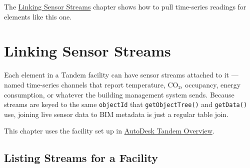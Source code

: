 \documentclass[
  11pt,
  letterpaper,
  DIV=11,
  numbers=noendperiod]{scrreprt}
\newenvironment{Shaded}{\begin{snugshade}}{\end{snugshade}}
\newcommand{\CommentTok}[1]{\textcolor[rgb]{0.37,0.37,0.37}{#1}}
\newcommand{\DecValTok}[1]{\textcolor[rgb]{0.68,0.00,0.00}{#1}}
\newcommand{\FunctionTok}[1]{\textcolor[rgb]{0.28,0.35,0.67}{#1}}
\newcommand{\NormalTok}[1]{\textcolor[rgb]{0.00,0.23,0.31}{#1}}
\newcommand{\OtherTok}[1]{\textcolor[rgb]{0.00,0.23,0.31}{#1}}
\newcommand{\SpecialCharTok}[1]{\textcolor[rgb]{0.37,0.37,0.37}{#1}}
\newcommand{\StringTok}[1]{\textcolor[rgb]{0.13,0.47,0.30}{#1}}
\begin{document}
\begin{Shaded}
\end{Shaded}

The \href{sensor-streams.qmd}{Linking Sensor Streams} chapter shows how
to pull time-series readings for elements like this one.

\chapter{Linking Sensor Streams}\label{linking-sensor-streams}

Each element in a Tandem facility can have sensor streams attached to it
--- named time-series channels that report temperature, CO₂, occupancy,
energy consumption, or whatever the building management system sends.
Because streams are keyed to the same \texttt{objectId} that
\texttt{getObjectTree()} and \texttt{getData()} use, joining live sensor
data to BIM metadata is just a regular table join.

This chapter uses the facility set up in
\hyperref[autodesk-tandem-overview]{AutoDesk Tandem Overview}.

\section{Listing Streams for a
Facility}\label{listing-streams-for-a-facility}
\end{document}
